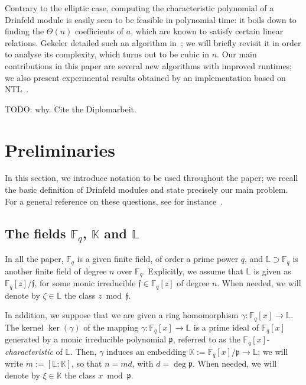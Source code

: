 \documentclass[sigconf]{acmart}
\newcommand{\K}{\mathbb{K}}
\newcommand{\F}{\mathbb{F}}
\renewcommand{\L}{\mathbb{L}}
\newcommand{\frakf}{\mathfrak{f}}
\newcommand{\frakp}{\mathfrak{p}}
\begin{document}
Contrary to the elliptic case, computing the characteristic polynomial
of a Drinfeld module is easily seen to be feasible in polynomial time:
it boils down to finding the $\Theta(n)$ coefficients of $a$, which
are known to satisfy certain linear relations. Gekeler detailed such
an algorithm in~\cite{GEKELE1991187}; we will briefly revisit it in
order to analyse its complexity, which turns out to be cubic in
$n$. Our main contributions in this paper are several new algorithms
with improved runtimes; we also present experimental results obtained
by an implementation based on NTL~\cite{shoup2001ntl}.

TODO: why. Cite the Diplomarbeit.


\section{Preliminaries}

In this section, we introduce notation to be used throughout the
paper; we recall the basic definition of Drinfeld modules and state
precisely our main problem. For a general reference on these
questions, see for instance~\cite{Goss96}.


\subsection{The fields $\F_q$, $\K$ and $\L$}\label{ssec:not}

In all the paper, $\F_q$ is a given finite field, of order a prime
power $q$, and $\L \supset \F_q$ is another finite field of degree $n$
over $\F_q$. Explicitly, we assume that $\L$ is given as
$\F_q[z]/\frakf$, for some monic irreducible $\frakf \in \F_q[z]$ of
degree $n$. When needed, we will denote by $\zeta \in \L$ the class $z \bmod
\frakf$.

In addition, we suppose that we are given a ring homomorphism $\gamma:
\F_q[x] \to \L$. The kernel $\ker(\gamma)$ of the mapping $\gamma:
\F_q[x] \to \L$ is a prime ideal of $\F_q[x]$ generated by a monic
irreducible polynomial $\frakp$, referred to as the
$\F_q[x]$-\textit{characteristic} of $\L$. Then, $\gamma$ induces an
embedding $\K := \F_q[x]/\frakp \to \L$; we will write $m := [\L :
  \K]$, so that $n = md$, with $d=\deg \frakp$. When needed, we will
denote by $\xi \in \K$ the class $x \bmod \frakp$.
\end{document}
